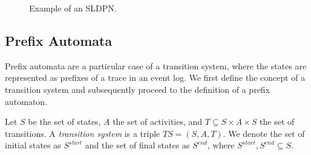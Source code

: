\begin{figure}[H]
    \centering
    \caption{Example of an SLDPN.}
    \label{fig:sldpn}
\end{figure}

\subsection{Prefix Automata} \label{subsec:transition_systems}

Prefix automata are a particular case of a transition system, where the states are represented as prefixes of a trace in an event log. We first define the concept of a transition system and subsequently proceed to the definition of a prefix automaton.

\begin{definition}
    Let $S$ be the set of states, $A$ the set of activities, and $T \subseteq S \times A \times S$ the set of transitions. A \emph{transition system} is a triple $\mathit{\mathit{TS}} = (S, A, T)$. We denote the set of initial states as $S^{start}$ and the set of final states as $S^{end}$, where $S^{start}, S^{end} \subseteq S$.
\end{definition}

